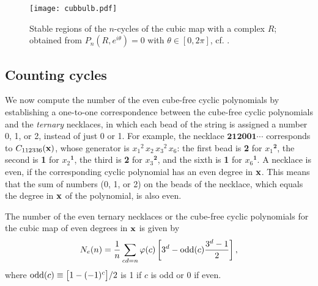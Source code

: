 \documentclass[preprint]{revtex4-1}
\begin{document}
\begin{figure}[h]
  \begin{minipage}{\linewidth}
    \begin{center}
        \texttt{[image: cubbulb.pdf]}
    \end{center}
  \end{minipage}%
  \caption{
  \label{fig:cubbulb}
  Stable regions of the $n$-cycles of the cubic map 
  with a complex $R$;
  obtained from $P_n(R, e^{i\theta}) = 0$ with $\theta \in [0, 2\pi]$,
  cf. .
}
\end{figure}


\subsection{Counting cycles}

We now compute the number of the even cube-free cyclic polynomials
by establishing a one-to-one correspondence between
the cube-free cyclic polynomials and the \emph{ternary} necklaces,
in which each bead of the string is assigned a number
0, 1, or 2, instead of just 0 or 1.
%
For example, the necklace $\mathbf{212001\cdots}$
corresponds to $C_{112336}(\mathbf{x})$,
whose generator is
${x_1}^2 \, {x_2} \, {x_3}^2 \, x_6$:
the first bead is \textbf{2} for ${x_1}^\mathbf{2}$,
 the second is \textbf{1} for ${x_2}^\mathbf{1}$,
 the third is \textbf{2} for ${x_3}^\mathbf{2}$,
 and the sixth is \textbf{1} for ${x_6}^\mathbf{1}$.
%
A necklace is even,
if the corresponding cyclic polynomial has an even degree in $\mathbf{x}$.
%
This means that the sum of numbers (0, 1, or 2)
  on the beads of the necklace,
  which equals the degree in $\mathbf{x}$ of the polynomial, is also even.

%


\begin{theorem}
The number of the even ternary necklaces
or the cube-free cyclic polynomials for the cubic map of even degrees in $\mathbf{x}$
is given by
\begin{equation}
  N_e(n) = \frac{1}{n} \sum_{c d = n} \varphi(c)
    \left[
      3^d - \mathrm{odd}(c) \frac{3^d-1}{2}
    \right],
\label{eq:cubnecklace}
\end{equation}
where
$\mathrm{odd}(c) \equiv \big[1 - (-1)^c\big]/2$ is 1 if $c$ is odd or 0 if even.
\label{thm:cubnecklace}
\end{theorem}
\end{document}
